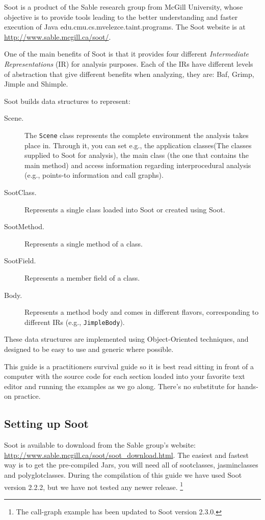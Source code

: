 \documentclass{article}
\newcommand{\code}[1]{\texttt{\small #1}}
\begin{document}
Soot is a product of the Sable research group from McGill University,
whose objective is to provide tools leading to the better
understanding and faster execution of Java edu.cmu.cs.mvelezce.taint.programs. The Soot website
is at \url{http://www.sable.mcgill.ca/soot/}.

One of the main benefits of Soot is that it provides four different
\emph{Intermediate Representations} (IR) for analysis purposes. Each
of the IRs have different levels of abstraction that give different
benefits when analyzing, they are: Baf, Grimp, Jimple and Shimple.

Soot builds data structures to represent:
\begin{description}
\item[Scene.] The \code{Scene} class represents the complete
  environment the analysis takes place in. Through it, you can set
  e.g., the application classes(The classes supplied to Soot for
  analysis), the main class (the one that contains the main method)
  and access information regarding interprocedural analysis (e.g.,
  points-to information and call graphs).
\item[SootClass.] Represents a single class loaded into Soot or
created using Soot.
\item[SootMethod.] Represents a single method of a class.
\item[SootField.] Represents a member field of a class.
\item[Body.] Represents a method body and comes in different flavors,
  corresponding to different IRs (e.g., \code{JimpleBody}).
\end{description}
These data structures are implemented using Object-Oriented
techniques, and designed to be easy to use and generic where possible.

This guide is a practitioners survival guide so it is best read
sitting in front of a computer with the source code for each section
loaded into your favorite text editor and running the examples as we
go along. There's no substitute for hands-on practice.

\subsection{Setting up Soot}

Soot is available to download from the Sable group's website:
\url{http://www.sable.mcgill.ca/soot/soot_download.html}. The easiest
and fastest way is to get the pre-compiled Jars, you will need all of
sootclasses, jasminclasses and polyglotclasses. During the compilation
of this guide we have used Soot version 2.2.2, but we have not tested
any newer release. \footnote{The call-graph example has been updated
  to Soot version 2.3.0.}
\end{document}
